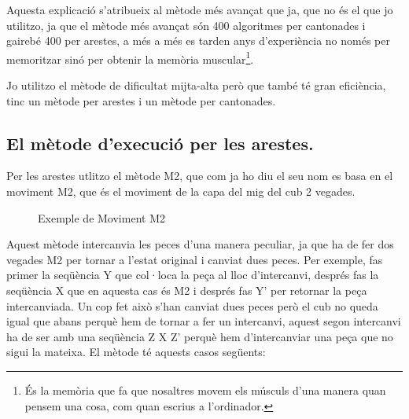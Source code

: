 Aquesta explicació s'atribueix al mètode més avançat que ja, que no és el que jo utilitzo, ja que el mètode més avançat són 400 algoritmes per cantonades i gairebé 400 per arestes, a més a més es tarden anys d'experiència no només per memoritzar sinó per obtenir la memòria muscular\footnote{És la memòria que fa que nosaltres movem els músculs d'una manera quan pensem una cosa, com quan escrius a l'ordinador.}.

Jo utilitzo el mètode de dificultat mijta-alta però que també té gran eficiència, tinc un mètode per arestes i un mètode per cantonades.

\subsection{El mètode d'execució per les arestes.}

Per les arestes utlitzo el mètode M2, que com ja ho diu el seu nom es basa en el moviment M2, que és el moviment de la capa del mig del cub 2 vegades.

\begin{figure}[h]
    \centering\RubikCubeSolvedWY
    \caption{Exemple de Moviment M2}
\end{figure}
    
Aquest mètode intercanvia les peces d'una manera peculiar, ja que ha de fer dos vegades M2 per tornar a l'estat original i canviat dues peces. Per exemple, fas primer la seqüència Y que col·loca la peça al lloc d'intercanvi, després fas la seqüència X que en aquesta cas és M2 i després fas Y' per retornar la peça intercanviada. Un cop fet això s'han canviat dues peces però el cub no queda igual que abans perquè hem de tornar a fer un intercanvi, aquest segon intercanvi ha de ser amb una seqüència Z X Z' perquè hem d'intercanviar una peça que no sigui la mateixa.
El mètode té aquests casos següents:

